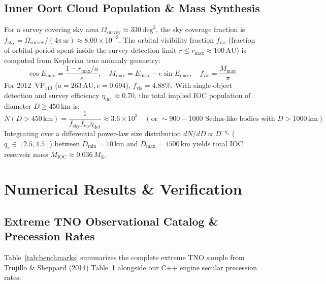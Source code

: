 \documentclass[11pt,a4paper]{article}
\begin{document}
\subsection{Inner Oort Cloud Population \& Mass Synthesis}
For a survey covering sky area $\Omega_{\text{survey}} \approx 330\,\text{deg}^2$, the sky coverage fraction is $f_{\text{sky}} = \Omega_{\text{survey}} / (4\pi\,\text{sr}) \approx 8.00\times 10^{-3}$. The orbital visibility fraction $f_{\text{vis}}$ (fraction of orbital period spent inside the survey detection limit $r \le r_{\text{max}} \approx 100\,\text{AU}$) is computed from Keplerian true anomaly geometry:
\begin{equation}
\cos E_{\text{max}} = \frac{1 - r_{\text{max}}/a}{e}, \quad M_{\text{max}} = E_{\text{max}} - e\sin E_{\text{max}}, \quad f_{\text{vis}} = \frac{M_{\text{max}}}{\pi}
\label{eq:f_vis}
\end{equation}
For 2012~$\text{VP}_{113}$ ($a=263\,\text{AU}, e=0.694$), $f_{\text{vis}} = 4.88\%$. With single-object detection and survey efficiency $\eta_{\text{det}} \approx 0.70$, the total implied IOC population of diameter $D \ge 450\,\text{km}$ is:
\begin{equation}
N(D > 450\,\text{km}) = \frac{1}{f_{\text{sky}} f_{\text{vis}} \eta_{\text{det}}} \approx 3.6\times 10^3 \quad (\text{or } \sim 900 - 1000 \text{ Sedna-like bodies with } D > 1000\,\text{km})
\label{eq:n_ioc}
\end{equation}
Integrating over a differential power-law size distribution $dN/dD \propto D^{-q_s}$ ($q_s \in [2.5, 4.5]$) between $D_{\text{min}} = 10\,\text{km}$ and $D_{\text{max}} = 1500\,\text{km}$ yields total IOC reservoir mass $M_{\text{IOC}} \approx 0.036\,M_\oplus$.

\section{Numerical Results \& Verification}

\subsection{Extreme TNO Observational Catalog \& Precession Rates}
Table~\ref{tab:benchmarks} summarizes the complete extreme TNO sample from Trujillo \& Sheppard (2014) Table~1 alongside our C++ engine secular precession rates.
\end{document}
